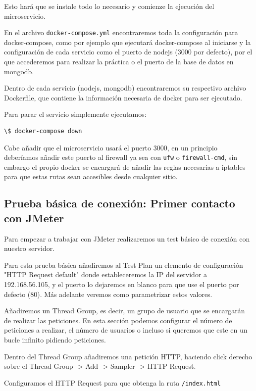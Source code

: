 \documentclass[12pt, spanish]{article}
\begin{document}
Esto hará que se instale todo lo necesario y comienze la ejecución del microservicio.

En el archivo \texttt{docker-compose.yml} encontraremos toda la configuración para docker-compose, como por ejemplo que ejecutará docker-compose al iniciarse y la configuración de cada servicio como el puerto de nodejs (3000 por defecto), por el que accederemos para realizar la práctica o el puerto de la base de datos en mongodb.

Dentro de cada servicio (nodejs, mongodb) encontraremos su respectivo archivo Dockerfile, que contiene la información necesaria de docker para ser ejecutado.

Para parar el servicio simplemente ejecutamos:
\begin{verbatim}
\$ docker-compose down
\end{verbatim}

Cabe añadir que el microservicio usará el puerto 3000, en un principio deberíamos añadir este puerto al firewall ya sea con \texttt{ufw} o \texttt{firewall-cmd}, sin embargo el propio docker se encargará de añadir las reglas necesarias a iptables para que estas rutas sean accesibles desde cualquier sitio.



\subsection{Prueba básica de conexión: Primer contacto con JMeter}

Para empezar a trabajar con JMeter realizaremos un test básico de conexión con nuestro servidor.


Para esta prueba básica añadiremos al Test Plan un elemento de configuración "HTTP Request default" donde estableceremos la IP del servidor a 192.168.56.105, y el puerto lo dejaremos en blanco para que use el puerto por defecto (80). Más adelante veremos como parametrizar estos valores.

Añadiremos un Thread Group, es decir, un grupo de usuario que se encargarán de realizar las peticiones. En esta sección podemos configurar el número de peticiones a realizar, el número de usuarios o incluso si queremos que este en un bucle infinito pidiendo peticiones.

Dentro del Thread Group añadiremos una petición HTTP, haciendo click derecho sobre el Thread Group -> Add -> Sampler -> HTTP Request.

Configuramos el HTTP Request para que obtenga la ruta \texttt{/index.html}
\end{document}
